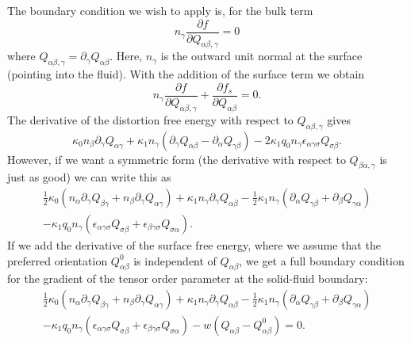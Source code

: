 The boundary condition we wish to apply is, for the bulk term
\begin{equation}
n_\gamma \frac{\partial f}{\partial Q_{\alpha\beta,\gamma}} = 0
\end{equation}
where $Q_{\alpha\beta,\gamma} = \partial_\gamma Q_{\alpha\beta}$. Here,
$n_\gamma$ is the outward unit normal at the surface (pointing into the
fluid). With the
addition of the surface term we obtain
\begin{equation}
n_\gamma \frac{\partial f}{\partial Q_{\alpha\beta,\gamma}}
+ \frac{\partial f_s}{\partial Q_{\alpha\beta}} = 0.
\end{equation}
The derivative of the distortion free energy with respect to
$Q_{\alpha\beta,\gamma}$ gives
\begin{equation}
\kappa_0 n_\beta \partial_\gamma Q_{\alpha\gamma}
+ \kappa_1 n_\gamma
(\partial_\gamma Q_{\alpha\beta} - \partial_\alpha Q_{\gamma\beta})
- 2\kappa_1 q_0 n_\gamma \epsilon_{\alpha\gamma\sigma} Q_{\sigma\beta}.
\end{equation}
However, if we want a symmetric form (the derivative with respect to
$Q_{\beta\alpha,\gamma}$ is just as good) we can write this as
\begin{eqnarray}
{\textstyle\frac{1}{2}} \kappa_0 (n_\alpha \partial_\gamma Q_{\beta\gamma}
+ n_\beta \partial_\gamma Q_{\alpha\gamma})
+ \kappa_1 n_\gamma \partial_\gamma Q_{\alpha\beta}
- {\textstyle\frac{1}{2}} \kappa_1 n_\gamma ( \partial_\alpha Q_{\gamma\beta}
+ \partial_\beta Q_{\gamma\alpha})
\nonumber
\\
- \kappa_1 q_0 n_\gamma (\epsilon_{\alpha\gamma\sigma} Q_{\sigma\beta}
+ \epsilon_{\beta\gamma\sigma}Q_{\sigma\alpha}).
\end{eqnarray}
If we add the derivative of the surface free energy,
where we assume that the preferred orientation $Q_{\alpha\beta}^0$ is
independent of $Q_{\alpha\beta}$, we get a full boundary condition
for the gradient of the tensor order parameter at the solid-fluid boundary:
\begin{eqnarray}
{\textstyle\frac{1}{2}} \kappa_0 (n_\alpha \partial_\gamma Q_{\beta\gamma}
+ n_\beta \partial_\gamma Q_{\alpha\gamma})
+ \kappa_1 n_\gamma \partial_\gamma Q_{\alpha\beta}
- {\textstyle\frac{1}{2}} \kappa_1 n_\gamma ( \partial_\alpha Q_{\gamma\beta}
+ \partial_\beta Q_{\gamma\alpha})
\nonumber
\\
- \kappa_1 q_0 n_\gamma (\epsilon_{\alpha\gamma\sigma} Q_{\sigma\beta}
+ \epsilon_{\beta\gamma\sigma}Q_{\sigma\alpha})
- w(Q_{\alpha\beta} - Q_{\alpha\beta}^0) = 0.
\label{cholesteric_bc}
\end{eqnarray}

